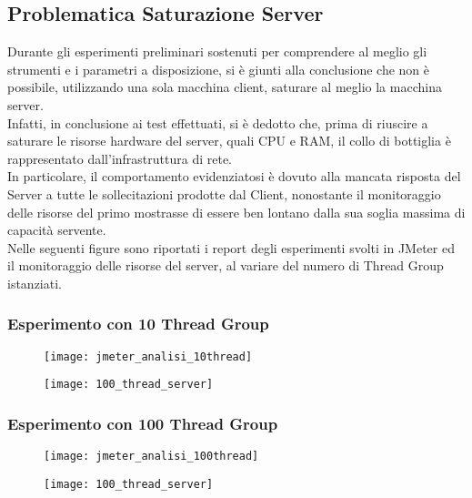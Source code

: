 \subsection{Problematica Saturazione Server}
Durante gli esperimenti preliminari sostenuti per comprendere al meglio gli strumenti
e i parametri a disposizione, si è giunti alla conclusione che non è possibile,
utilizzando una sola macchina client, saturare al meglio la macchina server.\\
Infatti, in conclusione ai test effettuati, si è dedotto che, prima di riuscire
a saturare le risorse hardware del server, quali CPU e RAM, il collo di bottiglia
è rappresentato dall'infrastruttura di rete.\\
In particolare, il comportamento evidenziatosi è dovuto alla mancata risposta
del Server a tutte le sollecitazioni prodotte dal Client, nonostante
il monitoraggio delle risorse del primo mostrasse di essere ben lontano
dalla sua soglia massima di capacità servente.\\
Nelle seguenti figure sono riportati i report degli esperimenti svolti in JMeter
ed il monitoraggio delle risorse del server, al variare del numero di Thread Group
istanziati.\\

\subsubsection{Esperimento con 10 Thread Group}
 \begin{minipage}{\linewidth}
 	\centering
 	\begin{minipage}{1\linewidth}
 		\begin{figure}[H]
 			\texttt{[image: jmeter\_analisi\_10thread]}
 		\end{figure}
 	\end{minipage}
 	\begin{minipage}{1\linewidth}
 		\begin{figure}[H]
 			\texttt{[image: 100\_thread\_server]}
    \end{figure}
  \end{minipage}
\end{minipage}

\subsubsection{Esperimento con 100 Thread Group}
 \begin{minipage}{\linewidth}
 	\centering
 	\begin{minipage}{1\linewidth}
 		\begin{figure}[H]
 			\texttt{[image: jmeter\_analisi\_100thread]}
 		\end{figure}
 	\end{minipage}
 	\begin{minipage}{1\linewidth}
 		\begin{figure}[H]
 			\texttt{[image: 100\_thread\_server]}
    \end{figure}
  \end{minipage}
\end{minipage}

